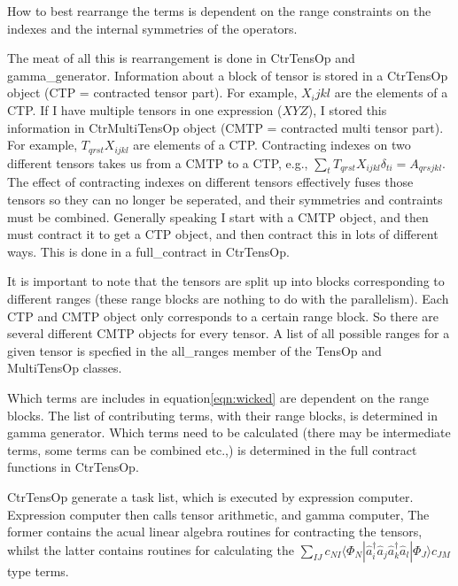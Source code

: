 \documentclass[12pt]{article}
\begin{document}
\begin{itemize}
How to best rearrange the terms is dependent on the range constraints on the indexes and the internal symmetries of the operators.

The meat of all this is rearrangement is done in CtrTensOp and gamma_generator.
Information about a block of tensor is stored in a CtrTensOp object (CTP = contracted tensor part).
For example, $X_ijkl$ are the elements of a CTP. 
If I have multiple tensors in one expression ($XYZ$), I stored this information in CtrMultiTensOp object (CMTP = contracted multi tensor part).
For example, $T_{qrst}X_{ijkl}$ are elements of a CTP. 
Contracting indexes on two different tensors takes us from a CMTP to a CTP, e.g., $\sum_{t}T_{qrst}X_{ijkl}\delta_{ti}=A_{qrsjkl} $. 
The effect of contracting indexes on different tensors effectively fuses those tensors so they can no longer be seperated, and their
symmetries and contraints must be combined. Generally speaking I start with a CMTP object, and then must contract it to get a CTP object, and
then contract this in lots of different ways. This is done in a full_contract in CtrTensOp.  

It is important to note that the tensors are split up into blocks corresponding
to different ranges (these range blocks are nothing to do with the
parallelism). Each CTP and CMTP object only corresponds to a certain range
block. So there are several different CMTP objects for every tensor. 
A list of all possible ranges for a given tensor is specfied in the all_ranges member of the TensOp and
MultiTensOp classes.

Which terms are includes in equation\ref{eqn:wicked} are dependent on
the range blocks. The list of contributing terms, with their range blocks, is determined in gamma generator. 
Which terms need to be calculated (there may be intermediate terms, some terms can be combined etc.,)
is determined in the full contract functions in CtrTensOp. 

CtrTensOp generate a task list, which is executed by expression computer.
Expression computer then calls tensor arithmetic,  and gamma computer,
The former contains the acual linear algebra routines for contracting the tensors,
whilst the latter contains routines for calculating 
the $\sum_{IJ} c_{NI}\langle \Phi_{N} |
\hat{a}_{i}^{\dagger}
\hat{a}_{j}
\hat{a}_{k}^{\dagger}
\hat{a}_{l}
| \Phi_{J} \rangle c_{JM}  $ type terms.


\end{itemize}
\end{document}
